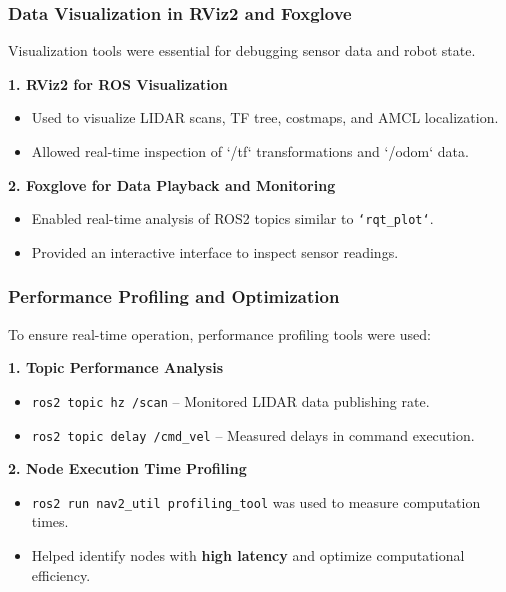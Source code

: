 \documentclass[english,project]{buwthesis}
\begin{document}
\subsubsection{Data Visualization in RViz2 and Foxglove}
Visualization tools were essential for debugging sensor data and robot state.


\textbf{1. RViz2 for ROS Visualization}
\begin{itemize}
    \item Used to visualize LIDAR scans, TF tree, costmaps, and AMCL localization.
    \item Allowed real-time inspection of `/tf` transformations and `/odom` data.
\end{itemize}

\textbf{2. Foxglove for Data Playback and Monitoring}
\begin{itemize}
    \item Enabled real-time analysis of ROS2 topics similar to \texttt{`rqt\_plot`}.
    \item Provided an interactive interface to inspect sensor readings.
\end{itemize}

\subsubsection{Performance Profiling and Optimization}
To ensure real-time operation, performance profiling tools were used:

\textbf{1. Topic Performance Analysis}
\begin{itemize}
    \item \texttt{ros2 topic hz /scan} -- Monitored LIDAR data publishing rate.
    \item \texttt{ros2 topic delay /cmd\_vel} -- Measured delays in command execution.
\end{itemize}

\textbf{2. Node Execution Time Profiling}
\begin{itemize}
    \item \texttt{ros2 run nav2\_util profiling\_tool} was used to measure computation times.
    \item Helped identify nodes with \textbf{high latency} and optimize computational efficiency.
\end{itemize}
\end{document}

